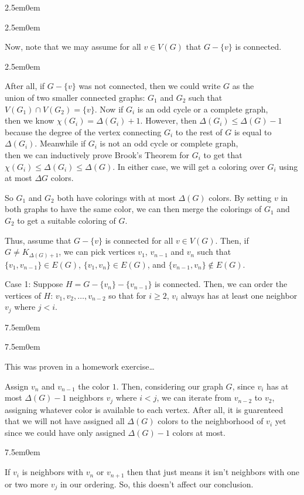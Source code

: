 \documentclass{book}
\newcommand{\hFour}{%
   \color{Cerulean}
   \fontsize{12}{14}\selectfont%
}
\newcommand{\teachComment}{
   \color{Orange}%
   \fontsize{12}{14}\selectfont%
}
\newenvironment{myIndent}{%
   \begin{adjustwidth}{2.5em}{0em}%
}{%
   \end{adjustwidth}%
}
\newenvironment{myTindent}{%
   \begin{adjustwidth}{7.5em}{0em}%
}{%
   \end{adjustwidth}%
}
\newcommand{\uuline}[2][.]{%
{\vphantom{a}\color{#1}%
\rlap{\rule[-0.18em]{\widthof{#2}}{0.06em}}%
\rlap{\rule[-0.32em]{\widthof{#2}}{0.06em}}}%
#2}
\newcommand{\retTwo}{\hfill\bigbreak}
\begin{document}
{\begin{myIndent}
{\begin{myIndent}
      Now, note that we may assume for all $v \in V(G)$ that $G - \{v\}$ is connected. 
      {\begin{myIndent} \hFour
         After all, if $G - \{v\}$ was not connected, then we could write $G$ as the\\ union of two smaller connected graphs: $G_1$ and $G_2$ such that\\ $V(G_1) \cap V(G_2) = \{v\}$. Now if $G_i$ is an odd cycle or a complete graph,\\ then we know $\chi(G_i) = \Delta(G_i) + 1$. However, then $\Delta(G_i) \leq \Delta(G) - 1$ because the degree of the vertex connecting $G_i$ to the rest of $G$ is equal to $\Delta(G_i)$. Meanwhile if $G_i$ is not an odd cycle or complete graph,\\ then we can inductively prove Brook's Theorem for $G_i$ to get that\\ $\chi(G_i) \leq \Delta(G_i) \leq \Delta(G)$. In either case, we will get a coloring over $G_i$ using at most $\Delta G$ colors. \retTwo

         So $G_1$ and $G_2$ both have colorings with at most $\Delta(G)$ colors. By setting $v$ in both graphs to have the same color, we  can then merge the colorings of $G_1$ and $G_2$ to get a suitable coloring of $G$.
         \retTwo
      \end{myIndent}}

      Thus, assume that $G - \{v\}$ is connected for all $v \in V(G)$. Then, if\\ $G \neq K_{\Delta(G) + 1}$, we can pick vertices $v_1$, $v_{n-1}$ and $v_{n}$ such that\\ $\{v_1, v_{n-1}\} \in E(G)$, $\{v_1, v_{n}\} \in E(G)$, and $\{v_{n-1}, v_{n}\} \notin E(G)$. \retTwo

      \uuline{Case 1}: Suppose $H = G - \{v_n\} - \{v_{n-1}\}$ is connected. Then, we can order the vertices of $H$: $v_1, v_2, \ldots, v_{n-2}$ so that for $i \geq 2$, $v_i$ always has at least one neighbor $v_j$ where $j < i$.
      {\begin{myTindent}\begin{myTindent} \teachComment
         This was proven in a homework exercise\dots\retTwo
      \end{myTindent}\end{myTindent}}

      Assign $v_n$ and $v_{n-1}$ the color $1$. Then, considering our graph $G$, since $v_i$ has at most $\Delta(G) - 1$ neighbors $v_j$ where $i < j$, we can iterate from $v_{n-2}$ to $v_2$, assigning whatever color is available to each vertex. After all, it is guarenteed that we will not have assigned all $\Delta(G)$ colors to the neighborhood of $v_i$ yet since we could have only assigned $\Delta(G) - 1$ colors at most.
      {\begin{myTindent} \hFour
         If $v_i$ is neighbors with $v_n$ or $v_{n+1}$ then that just means it isn't neighbors with one or two more $v_j$ in our ordering. So, this doesn't affect our conclusion. \retTwo
      \end{myTindent}}


\end{myIndent}}
\end{myIndent}}
\end{document}
